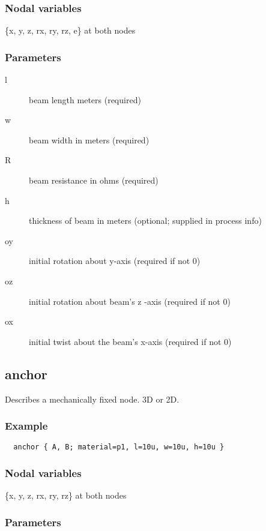 \subsubsection*{Nodal variables}

\{x, y, z, rx, ry, rz, e\} at both nodes 
 
\subsubsection*{Parameters}
\begin{description}
 \item[l] beam length meters (required) 
 \item[w] beam width in meters (required) 
 \item[R] beam resistance in ohms (required) 
 \item[h] thickness of beam in meters (optional; supplied in process info) 
 \item[oy] initial rotation about y-axis (required if not 0) 
 \item[oz] initial rotation about beam's z -axis (required if not 0) 
 \item[ox] initial twist about the beam's x-axis (required if not 0) 
\end{description}


\subsection{anchor}
 
Describes a mechanically fixed node. 3D or 2D. 

\subsubsection*{Example}
\begin{verbatim}
  anchor { A, B; material=p1, l=10u, w=10u, h=10u }
\end{verbatim}
 
\subsubsection*{Nodal variables}

\{x, y, z, rx, ry, rz\} at both nodes 
 
\subsubsection*{Parameters}

